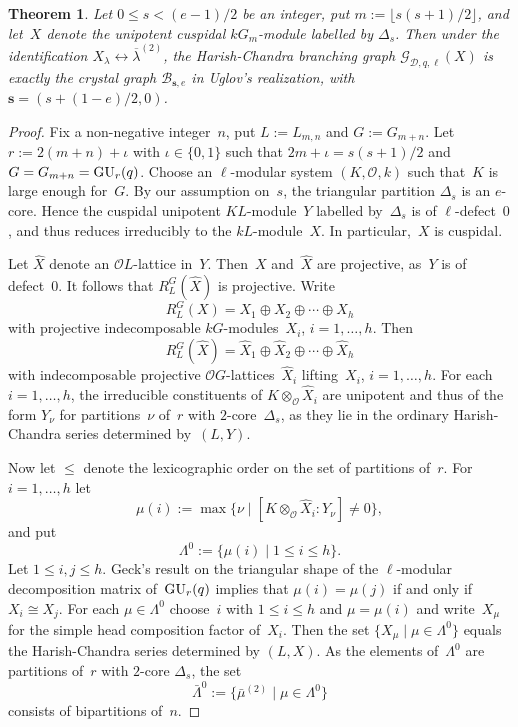 \documentclass[twoside,12pt]{amsart}
\theoremstyle{plain}
\newtheorem{thm}[num]{Theorem}
\begin{document}
\begin{thm}
\label{MainTheoremUnitaryGroups}
Let $0 \leq s < (e - 1)/2$ be an integer, put $m := \lfloor s(s+1)/2 \rfloor$,
and let~$X$ denote the unipotent cuspidal $kG_m$-module labelled by $\Delta_s$.
Then under the identification $X_{\lambda} \leftrightarrow \overline{\lambda}^{(2)}$,
the Harish-Chandra branching graph $\mathcal{G}_{\mathcal{D},q,\ell}( X )$
is exactly the crystal graph $\mathcal{B}_{\mathbf{s},e}$
in Uglov's realization, with ${\mathbf{s}} = ( s + (1-e)/2, 0 )$.
\end{thm}
\begin{proof}
Fix a non-negative integer~$n$, put $L := L_{m,n}$ and $G := G_{m+n}$. Let
$r := 2(m+n) + \iota$ with $\iota \in \{0,1\}$ such that $2m + \iota = s(s+1)/2$
and $G = G_{m+n} = {\mbox{\rm GU}}_r(q)$. 
Choose an $\ell$-modular system $(K, \mathcal{O}, k)$ such that~$K$ is large 
enough for~$G$. By our assumption on~$s$, the triangular partition $\Delta_s$
is an $e$-core. Hence the cuspidal unipotent $KL$-module~$Y$ labelled 
by~$\Delta_s$ is of $\ell$-defect~$0$,
and thus reduces irreducibly to the $kL$-module~$X$. In particular,~$X$ is 
cuspidal.

Let $\hat{X}$ denote an $\mathcal{O}L$-lattice in~$Y$. Then~$X$ and~$\hat{X}$ 
are projective, as~$Y$ is of defect~$0$. It follows that $R_L^G( \hat{X} )$ is 
projective. Write 
$$R_L^G( X ) = X_1 \oplus X_2 \oplus \cdots \oplus X_h$$
with projective indecomposable $kG$-modules~$X_i$, $i = 1, \dots , h$. Then
$$R_L^G( \hat{X} ) = \hat{X}_1 \oplus \hat{X}_2 \oplus \cdots \oplus \hat{X}_h$$
with indecomposable projective $\mathcal{O}G$-lattices~$\hat{X}_i$ 
lifting~$X_i$, $i = 1, \ldots , h$. For each $i = 1 , \ldots , h$, the 
irreducible constituents of $K \otimes_\mathcal{O} \hat{X}_i$ are unipotent and
thus of the form $Y_\nu$ for partitions~$\nu$ of~$r$ with $2$-core~$\Delta_s$, 
as they lie in the ordinary Harish-Chandra series determined by~$(L,Y)$.

Now let $\leq$ denote the lexicographic order on the set of partitions of~$r$.
For $i = 1, \ldots , h$ let 
$$\mu(i) := 
\max\{ \nu \mid [ K \otimes_{\mathcal{O}} \hat{X}_i \colon\!Y_\nu ] \neq 0 \},$$
and put 
$$\Lambda^0 := \{ \mu(i) \mid 1 \leq i \leq h \}.$$
Let $1 \leq i, j \leq h$. Geck's result \cite{Geck1991} on the triangular shape 
of the $\ell$-modular decomposition matrix of~${\mbox{\rm GU}}_r(q)$ implies that $\mu(i) = 
\mu(j)$ if and only if $X_i \cong X_j$. For each $\mu \in \Lambda^0$ choose~$i$ 
with $1 \leq i \leq h$ and $\mu = \mu(i)$ and write~$X_\mu$ for the simple head
composition factor of~$X_i$. Then the set $\{ X_\mu \mid \mu \in \Lambda^0 \}$ 
equals the Harish-Chandra series determined by $(L,X)$. 
As the elements of~$\Lambda^0$ are partitions of~$r$ with $2$-core $\Delta_s$, 
the set 
$$\bar{\Lambda}^0 := \{ \bar{\mu}^{(2)} \mid \mu \in \Lambda^0 \}$$ 
consists of bipartitions of~$n$.


\end{proof}
\end{document}
